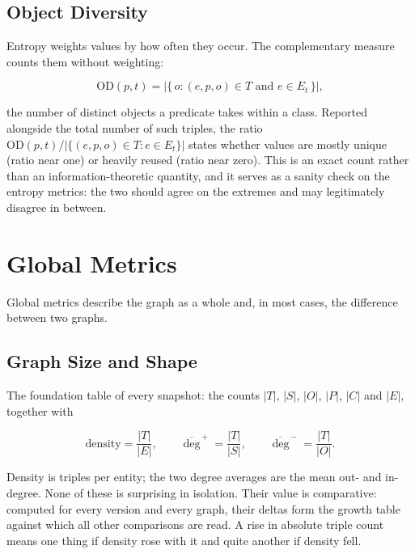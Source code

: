 \subsection{Object Diversity}

Entropy weights values by how often they occur. The complementary measure counts
them without weighting:

\begin{equation}
  \mathrm{OD}(p, t) = |\{\, o : (e, p, o) \in T \text{ and } e \in E_t \,\}|,
  \label{eq:objdiv}
\end{equation}

the number of distinct objects a predicate takes within a class. Reported
alongside the total number of such triples, the ratio
$\mathrm{OD}(p,t) / |\{(e,p,o) \in T : e \in E_t\}|$ states whether values are
mostly unique (ratio near one) or heavily reused (ratio near zero). This is an
exact count rather than an information-theoretic quantity, and it serves as a
sanity check on the entropy metrics: the two should agree on the extremes and may
legitimately disagree in between.

\section{Global Metrics}
\label{sec:global_metrics}

Global metrics describe the graph as a whole and, in most cases, the difference
between two graphs.

\subsection{Graph Size and Shape}
\label{subsec:shape_metric}

The foundation table of every snapshot: the counts $|T|$, $|S|$, $|O|$, $|P|$,
$|C|$ and $|E|$, together with

\begin{equation}
  \mathrm{density} = \frac{|T|}{|E|},
  \qquad
  \overline{\deg}^{\,+} = \frac{|T|}{|S|},
  \qquad
  \overline{\deg}^{\,-} = \frac{|T|}{|O|}.
  \label{eq:shape}
\end{equation}

Density is triples per entity; the two degree averages are the mean out- and
in-degree. None of these is surprising in isolation. Their value is comparative:
computed for every version and every graph, their deltas form the growth table
against which all other comparisons are read. A rise in absolute triple count
means one thing if density rose with it and quite another if density fell.

